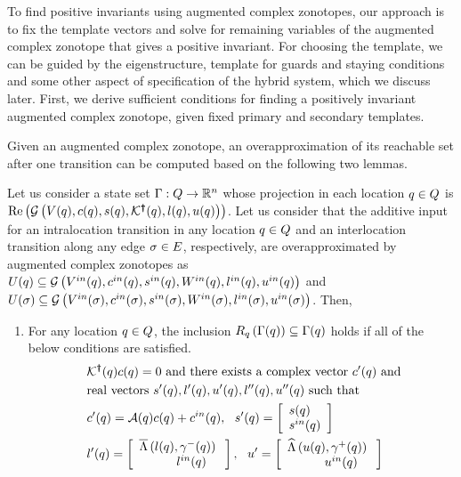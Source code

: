 To find positive invariants using augmented complex zonotopes, our
approach is to fix the template vectors and solve for remaining
variables of the augmented complex zonotope that gives a positive
invariant.  For choosing the template, we can be guided by the
eigenstructure, template for guards and staying conditions and some
other aspect of specification of the hybrid system, which we discuss
later.  First, we derive sufficient conditions for finding a
positively invariant augmented complex zonotope, given fixed primary
and secondary templates.

Given an augmented complex zonotope, an overapproximation of its reachable set after one
transition can be computed based on the following two lemmas.
\begin{lemma}
  Let us consider a state set $\Gamma:Q\rightarrow\mathbb{R}^n$ whose projection in each
  location $q\in Q$ is $\operatorname{\operatorname{Re}}\left(\mathcal{G}\left(V(q),c(q),s(q),\mathcal{K}^{\bm{\dagger}}(q),l(q),u(q)\right)\right)$.
  Let us consider that the
  additive input for an intralocation transition in any location 
  $q\in Q$ and an interlocation transition along any edge
  $\sigma\in E$, respectively, are
  overapproximated by augmented complex zonotopes as $U(q)\subseteq
  \mathcal{G}\left(V^{in}(q),c^{in}(q),s^{in}(q),W^{in}(q),l^{in}(q),u^{in}(q)\right)$
  and $U(\sigma)\subseteq
  \mathcal{G}\left(V^{in}(\sigma),c^{in}(\sigma),s^{in}(\sigma),W^{in}(\sigma),l^{in}(\sigma),u^{in}(\sigma)\right)$.  Then,
\begin{enumerate}
\item For any location $q\in Q$, the inclusion
  $R_{q}\left(\Gamma(q)\right)\subseteq
  \Gamma(q)$ holds if 
  all of the below conditions are satisfied.
\begin{align}~\label{eqn:locinv}
\begin{split}
& \pinv{\ptemplate}(\loc)c(\loc) = 0~\text{and there exists a complex vector}~
  c^\pr(\loc)~\text{and}\\
& \text{real
    vectors}~s^\pr(\loc),l^\pr(\loc),u^\pr(\loc),l^\dpr(\loc),u^\dpr(\loc)~\text{such
    that}\\
& c^\pr(\loc) = \map(\loc)c(\loc)+c^{in}(\loc),~~s^\pr(\loc) =
  \ColumnJoin{s(\loc)}{s^{in}(\loc)}\\
& l^\pr(\loc) =
  \ColumnJoin{\maxaffine{l(\loc)}{\stay^-(\loc)}}{~~~~~~~~~l^{in}(\loc)~~~},~~u^\pr =
  \ColumnJoin{\minaffine{u(\loc)}{\stay^+(\loc)}}{~~~~~~~~~u^{in}(\loc)~~~}\\

\end{split}
\end{align}
\end{enumerate}
\end{lemma}
